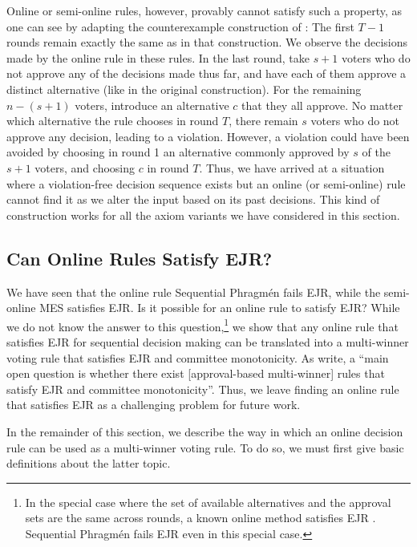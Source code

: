 \documentclass[10pt]{scrartcl}
\theoremstyle{plain}
\theoremstyle{definition}
\begin{document}
Online or semi-online rules, however, provably cannot satisfy such a property, as one can see by adapting the counterexample construction of :
The first $T - 1$ rounds remain exactly the same as in that construction. We observe the decisions made by the online rule in these rules. In the last round, take $s+1$ voters who do not approve any of the decisions made thus far, and have each of them approve a distinct alternative (like in the original construction). For the remaining $n - (s+1)$ voters, introduce an alternative $c$ that they all approve. No matter which alternative the rule chooses in round $T$, there remain $s$ voters who do not approve any decision, leading to a violation. However, a violation could have been avoided by choosing in round 1 an alternative commonly approved by $s$ of the $s+1$ voters, and choosing $c$ in round $T$. Thus, we have arrived at a situation where a violation-free decision sequence exists but an online (or semi-online) rule cannot find it as we alter the input based on its past decisions. This kind of construction works for all the axiom variants we have considered in this section.

\subsection{Can Online Rules Satisfy EJR?}
\label{app:online-ejr}

We have seen that the online rule Sequential Phragm\'en fails EJR, while the semi-online MES satisfies EJR. Is it possible for an online rule to satisfy EJR?
While we do not know the answer to this question,\footnote{In the special case where the set of available alternatives and the approval sets are the same across rounds, a known online method satisfies EJR \citep{approvalbasedapportionment}. Sequential Phragm\'en fails EJR even in this special case.}
we show that any online rule that satisfies EJR for sequential decision making can be translated into a multi-winner voting rule that satisfies EJR and committee monotonicity.
As \citet[Sec.~7.1]{lacknerskowron} write, a ``main open question is whether there exist [approval-based multi-winner] rules that satisfy EJR and committee monotonicity''. Thus, we leave finding an online rule that satisfies EJR as a challenging problem for future work.

In the remainder of this section, we describe the way in which an online decision rule can be used as a multi-winner voting rule. To do so, we must first give basic definitions about the latter topic. 
\end{document}
